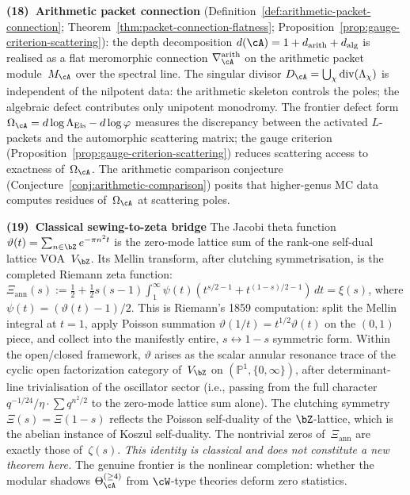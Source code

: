 \smallskip\noindent
\textbf{(18)~Arithmetic packet connection}
(Definition~\ref{def:arithmetic-packet-connection};
Theorem~\ref{thm:packet-connection-flatness};
Proposition~\ref{prop:gauge-criterion-scattering}):
the depth decomposition $d(\cA) = 1 + d_{\mathrm{arith}} + d_{\mathrm{alg}}$
is realised as a flat meromorphic connection
$\nabla_\cA^{\mathrm{arith}}$ on the arithmetic packet
module~$M_\cA$ over the spectral line. The singular divisor
$D_\cA = \bigcup_\chi\operatorname{div}(\Lambda_\chi)$
is independent of the nilpotent data: the arithmetic skeleton
controls the poles; the algebraic defect contributes only
unipotent monodromy. The frontier defect form
$\Omega_\cA = d\log\Lambda_{\mathrm{Eis}} - d\log\varphi$
measures the discrepancy between the activated $L$-packets and
the automorphic scattering matrix; the gauge criterion
(Proposition~\ref{prop:gauge-criterion-scattering}) reduces
scattering access to exactness of~$\Omega_\cA$.
The arithmetic comparison conjecture
(Conjecture~\ref{conj:arithmetic-comparison})
posits that higher-genus MC data computes residues
of~$\Omega_\cA$ at scattering poles.

\smallskip\noindent
\textbf{(19)~Classical sewing-to-zeta bridge}
\label{item:concordance-classical-sewing-zeta}%
%
%
The Jacobi theta function $\vartheta(t) = \sum_{n\in\bZ}
e^{-\pi n^2 t}$ is the zero-mode lattice sum of the
rank-one self-dual lattice VOA~$V_\bZ$. Its Mellin
transform, after clutching symmetrisation, is the
completed Riemann zeta function:
$\Xi_{\mathrm{ann}}(s) := \tfrac12 + \tfrac12 s(s{-}1)
\int_1^\infty \psi(t)(t^{s/2-1} + t^{(1-s)/2-1})\,dt
= \xi(s)$,
where $\psi(t) = (\vartheta(t)-1)/2$.
This is Riemann's 1859 computation: split the Mellin
integral at $t=1$, apply Poisson summation
$\vartheta(1/t) = t^{1/2}\vartheta(t)$ on the $(0,1)$
piece, and collect into the manifestly entire,
$s \leftrightarrow 1{-}s$ symmetric form.
Within the open/closed framework, $\vartheta$ arises as the
scalar annular resonance trace of the cyclic open
factorization category of~$V_\bZ$ on
$({\mathbb P}^1, \{0,\infty\})$, after determinant-line
trivialisation of the oscillator sector (i.e., passing from
the full character $q^{-1/24}/\eta \cdot \sum q^{n^2/2}$
to the zero-mode lattice sum alone). The
clutching symmetry $\Xi(s) = \Xi(1{-}s)$
reflects the Poisson self-duality of the
$\bZ$-lattice, which is the abelian instance of
Koszul self-duality. The nontrivial zeros
of~$\Xi_{\mathrm{ann}}$ are exactly those of~$\zeta(s)$.
\emph{This identity is classical and does not
constitute a new theorem here.}
The genuine frontier is the nonlinear completion:
whether the modular shadows $\Theta_{\cA}^{(\geq 4)}$
from $\cW$-type theories deform zero statistics.

